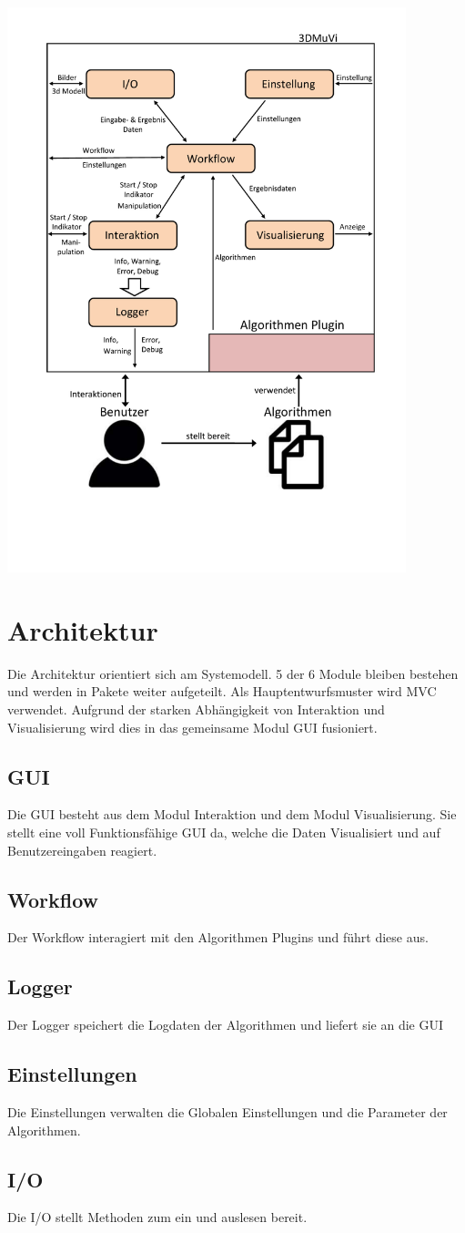 \includegraphics[width=0.87\textwidth]{img/Datenflussuebersicht.pdf}
\newpage
\section{Architektur}
Die Architektur orientiert sich am Systemodell. 5 der 6 Module bleiben bestehen und werden in Pakete weiter aufgeteilt. Als Hauptentwurfsmuster wird MVC verwendet.
Aufgrund der starken Abhängigkeit von Interaktion und Visualisierung wird dies in das gemeinsame Modul GUI fusioniert. 
\subsection{GUI}
Die GUI besteht aus dem Modul Interaktion und dem Modul Visualisierung.
Sie stellt eine voll Funktionsfähige GUI da, welche die Daten Visualisiert und auf Benutzereingaben reagiert.
\subsection{Workflow}
Der Workflow interagiert mit den Algorithmen Plugins und führt diese aus.
\subsection{Logger}
Der Logger speichert die Logdaten der Algorithmen und liefert sie an die GUI
\subsection{Einstellungen}
Die Einstellungen verwalten die Globalen Einstellungen und die Parameter der Algorithmen.
\subsection{I/O}
Die I/O stellt Methoden zum ein und auslesen bereit.
